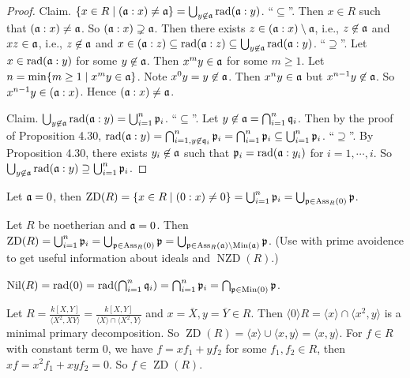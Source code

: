 \begin{proof}
    Claim. $\{x \in R \mid (\mathfrak{a}:x) \neq \mathfrak{a}\} = \bigcup_{y \not\in \mathfrak{a}} \operatorname{rad}(\mathfrak{a}:y)$. ``$\subseteq$''. Then $x \in R$ such that $(\mathfrak{a}:x) \neq \mathfrak{a}$. So $(\mathfrak{a}:x) \supsetneq \mathfrak{a}$. Then there exists $z \in (\mathfrak{a}:x) \setminus \mathfrak{a}$, i.e., $z \not \in \mathfrak{a}$ and $xz \in \mathfrak{a}$, i.e., $z \not \in \mathfrak{a}$ and $x \in (\mathfrak{a}:z) \subseteq \operatorname{rad}(\mathfrak{a}:z) \subseteq \bigcup_{y \not\in \mathfrak{a}} \operatorname{rad}(\mathfrak{a}:y)$. ``$\supseteq$''. Let $x \in \operatorname{rad}(\mathfrak{a}:y)$ for some $y \not\in \mathfrak{a}$. Then $x^{m}y \in \mathfrak{a}$ for some $m \geq 1$. Let $n = \min\{m \geq 1 \mid x^{m}y \in \mathfrak{a}\}$. Note $x^{0}y = y \not \in \mathfrak{a}$. Then $x^{n}y \in \mathfrak{a}$ but $x^{n-1}y \not \in \mathfrak{a}$. So $x^{n-1}y \in (\mathfrak{a}:x)$. Hence $(\mathfrak{a}:x) \neq \mathfrak{a}$. \par
    Claim. $\bigcup_{y \not\in \mathfrak{a}} \operatorname{rad}(\mathfrak{a}:y) = \bigcup_{i=1}^{n}\mathfrak{p}_i$. ``$\subseteq$''. Let $y \not\in \mathfrak{a} = \bigcap_{i=1}^{n} \mathfrak{q}_i$. Then by the proof of Proposition 4.30, $\operatorname{rad}(\mathfrak{a}:y) = \bigcap_{i=1,y \not \in \mathfrak{q}_i}^{n} \mathfrak{p}_i = \bigcap_{i=1}^{n} \mathfrak{p}_i \subseteq \bigcup_{i=1}^{n}\mathfrak{p}_i$. ``$\supseteq$''. By Proposition 4.30, there exists $y_i \not \in \mathfrak{a}$ such that $\mathfrak{p}_i = \operatorname{rad}(\mathfrak{a}:y_i)$ for $i = 1,\cdots,i$. So $\bigcup_{y \not\in \mathfrak{a}} \operatorname{rad}(\mathfrak{a}:y) \supseteq \bigcup_{i=1}^{n} \mathfrak{p}_i$. 
\end{proof}

\begin{corollary}
    Let $\mathfrak{a} = 0$, then $\operatorname{ZD}(R) = \{x \in R \mid (0:x) \neq 0\} = \bigcup_{i=1}^{n} \mathfrak{p}_i = \bigcup_{\mathfrak{p} \in \operatorname{Ass}_R(0)}\mathfrak{p}$.
\end{corollary}

\begin{summary}
    Let $R$ be noetherian and $\mathfrak{a} = 0$. Then $\operatorname{ZD}(R) = \bigcup_{i=1}^{n} \mathfrak{p}_i = \bigcup_{\mathfrak{p} \in \operatorname{Ass}_R(0)}\mathfrak{p} = \bigcup_{\mathfrak{p} \in \operatorname{Ass}_R(\mathfrak{a}) \setminus \operatorname{Min}(\mathfrak{a})} \mathfrak{p}$. (Use with prime avoidence to get useful information about ideals and $\operatorname{NZD}(R)$.) \par 
    $\operatorname{Nil}(R) = \operatorname{rad}(0) = \operatorname{rad}(\bigcap_{i=1}^{n}\mathfrak{q}_i) = \bigcap_{i=1}^{n} \mathfrak{p}_i = \bigcap_{\mathfrak{p} \in \operatorname{Min}(0)} \mathfrak{p}$.
\end{summary}

\begin{example*}
    Let $R = \frac{k[X,Y]}{\langle X^{2},XY \rangle} = \frac{k[X,Y]}{\langle X \rangle \cap \langle X^{2},Y \rangle}$ and $x = \overbar{X}, y= \overbar{Y} \in R$. Then $\langle 0 \rangle R = \langle x \rangle \cap \langle x^{2}, y \rangle$ is a minimal primary decomposition. So $\operatorname{ZD}(R) = \langle x \rangle \cup \langle x, y \rangle = \langle x, y \rangle$. For $f \in R$ with constant term 0, we have $f = xf_1 + yf_2$ for some $f_1,f_2 \in R$, then $xf = x^{2}f_1 + xyf_2 = 0$. So $f \in \operatorname{ZD}(R)$.
\end{example*}

